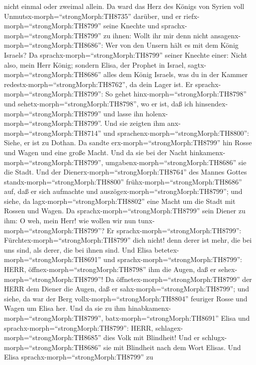 nicht einmal oder zweimal allein.  Da ward das Herz des
Königs von Syrien voll Unmutsx-morph=``strongMorph:TH8735'' darüber, und
er riefx-morph=``strongMorph:TH8799'' seine Knechte und
sprachx-morph=``strongMorph:TH8799'' zu ihnen: Wollt ihr mir denn nicht
ansagenx-morph=``strongMorph:TH8686'': Wer von den Unsern hält es mit
dem König Israels?  Da sprachx-morph=``strongMorph:TH8799''
seiner Knechte einer: Nicht also, mein Herr König; sondern Elisa, der
Prophet in Israel, sagtx-morph=``strongMorph:TH8686'' alles dem König
Israels, was du in der Kammer redestx-morph=``strongMorph:TH8762'', da
dein Lager ist.  Er sprachx-morph=``strongMorph:TH8799'':
So gehet hinx-morph=``strongMorph:TH8798'' und
sehetx-morph=``strongMorph:TH8798'', wo er ist, daß ich
hinsendex-morph=``strongMorph:TH8799'' und lasse ihn
holenx-morph=``strongMorph:TH8799''. Und sie zeigten ihm
anx-morph=``strongMorph:TH8714'' und
sprachenx-morph=``strongMorph:TH8800'': Siehe, er ist zu Dothan.
 Da sandte erx-morph=``strongMorph:TH8799'' hin Rosse und
Wagen und eine große Macht. Und da sie bei der Nacht
hinkamenx-morph=``strongMorph:TH8799'',
umgabenx-morph=``strongMorph:TH8686'' sie die Stadt.  Und
der Dienerx-morph=``strongMorph:TH8764'' des Mannes Gottes
standx-morph=``strongMorph:TH8800'' frühx-morph=``strongMorph:TH8686''
auf, daß er sich aufmachte und auszögex-morph=``strongMorph:TH8799'';
und siehe, da lagx-morph=``strongMorph:TH8802'' eine Macht um die Stadt
mit Rossen und Wagen. Da sprachx-morph=``strongMorph:TH8799'' sein
Diener zu ihm: O weh, mein Herr! wie wollen wir nun
tunx-morph=``strongMorph:TH8799''?  Er
sprachx-morph=``strongMorph:TH8799'':
Fürchtex-morph=``strongMorph:TH8799'' dich nicht! denn derer ist mehr,
die bei uns sind, als derer, die bei ihnen sind.  Und Elisa
betetex-morph=``strongMorph:TH8691'' und
sprachx-morph=``strongMorph:TH8799'': HERR,
öffnex-morph=``strongMorph:TH8798'' ihm die Augen, daß er
sehex-morph=``strongMorph:TH8799''! Da
öffnetex-morph=``strongMorph:TH8799'' der HERR dem Diener die Augen, daß
er sahx-morph=``strongMorph:TH8799''; und siehe, da war der Berg
vollx-morph=``strongMorph:TH8804'' feuriger Rosse und Wagen um Elisa
her.  Und da sie zu ihm
hinabkamenx-morph=``strongMorph:TH8799'',
batx-morph=``strongMorph:TH8691'' Elisa und
sprachx-morph=``strongMorph:TH8799'': HERR,
schlagex-morph=``strongMorph:TH8685'' dies Volk mit Blindheit! Und er
schlugx-morph=``strongMorph:TH8686'' sie mit Blindheit nach dem Wort
Elisas.  Und Elisa sprachx-morph=``strongMorph:TH8799'' zu
